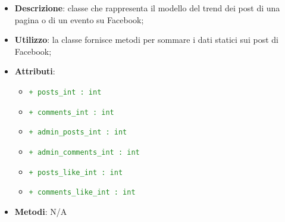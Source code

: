 				\begin{itemize}
					\item \textbf{Descrizione}: classe che rappresenta il modello del trend dei post di una pagina o di un evento su Facebook;
					\item \textbf{Utilizzo}: la classe fornisce metodi per sommare i dati statici sui post di Facebook;
					\item \textbf{Attributi}:
					\begin{itemize}
						\item \textcolor{forestgreen}{\texttt{+ posts\_int : int}}
						\item \textcolor{forestgreen}{\texttt{+ comments\_int : int}}
						\item \textcolor{forestgreen}{\texttt{+ admin\_posts\_int : int}}
						\item \textcolor{forestgreen}{\texttt{+ admin\_comments\_int : int}}
						\item \textcolor{forestgreen}{\texttt{+ posts\_like\_int : int}}
						\item \textcolor{forestgreen}{\texttt{+ comments\_like\_int : int}}
					\end{itemize}
					\item \textbf{Metodi}: N/A
				\end{itemize}



